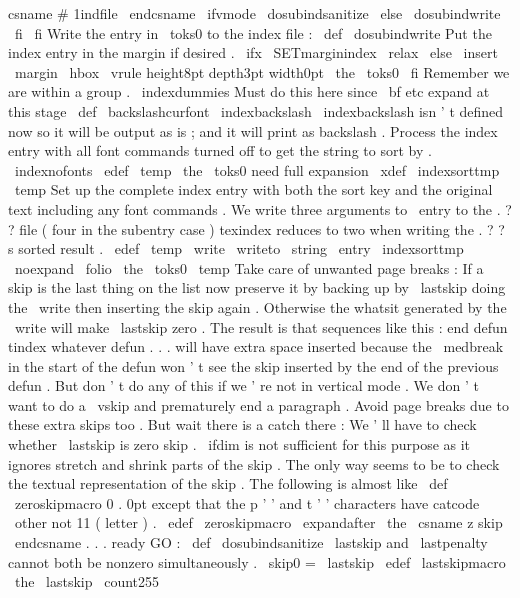 {{{{csname
#
1indfile
\
endcsname
}
%
%
\
ifvmode
\
dosubindsanitize
\
else
\
dosubindwrite
\
fi
}
%
\
fi
}
%
Write
the
entry
in
\
toks0
to
the
index
file
:
%
\
def
\
dosubindwrite
{
%
%
Put
the
index
entry
in
the
margin
if
desired
.
\
ifx
\
SETmarginindex
\
relax
\
else
\
insert
\
margin
{
\
hbox
{
\
vrule
height8pt
depth3pt
width0pt
\
the
\
toks0
}
}
%
\
fi
%
%
Remember
we
are
within
a
group
.
\
indexdummies
%
Must
do
this
here
since
\
bf
etc
expand
at
this
stage
\
def
\
backslashcurfont
{
\
indexbackslash
}
%
\
indexbackslash
isn
'
t
defined
now
%
so
it
will
be
output
as
is
;
and
it
will
print
as
backslash
.
%
%
Process
the
index
entry
with
all
font
commands
turned
off
to
%
get
the
string
to
sort
by
.
{
\
indexnofonts
\
edef
\
temp
{
\
the
\
toks0
}
%
need
full
expansion
\
xdef
\
indexsorttmp
{
\
temp
}
%
}
%
%
%
Set
up
the
complete
index
entry
with
both
the
sort
key
and
%
the
original
text
including
any
font
commands
.
We
write
%
three
arguments
to
\
entry
to
the
.
?
?
file
(
four
in
the
%
subentry
case
)
texindex
reduces
to
two
when
writing
the
.
?
?
s
%
sorted
result
.
\
edef
\
temp
{
%
\
write
\
writeto
{
%
\
string
\
entry
{
\
indexsorttmp
}
{
\
noexpand
\
folio
}
{
\
the
\
toks0
}
}
%
}
%
\
temp
}
%
Take
care
of
unwanted
page
breaks
:
%
%
If
a
skip
is
the
last
thing
on
the
list
now
preserve
it
%
by
backing
up
by
\
lastskip
doing
the
\
write
then
inserting
%
the
skip
again
.
Otherwise
the
whatsit
generated
by
the
%
\
write
will
make
\
lastskip
zero
.
The
result
is
that
sequences
%
like
this
:
%
end
defun
%
tindex
whatever
%
defun
.
.
.
%
will
have
extra
space
inserted
because
the
\
medbreak
in
the
%
start
of
the
defun
won
'
t
see
the
skip
inserted
by
the
end
of
%
the
previous
defun
.
%
%
But
don
'
t
do
any
of
this
if
we
'
re
not
in
vertical
mode
.
We
%
don
'
t
want
to
do
a
\
vskip
and
prematurely
end
a
paragraph
.
%
%
Avoid
page
breaks
due
to
these
extra
skips
too
.
%
%
But
wait
there
is
a
catch
there
:
%
We
'
ll
have
to
check
whether
\
lastskip
is
zero
skip
.
\
ifdim
is
not
%
sufficient
for
this
purpose
as
it
ignores
stretch
and
shrink
parts
%
of
the
skip
.
The
only
way
seems
to
be
to
check
the
textual
%
representation
of
the
skip
.
%
%
The
following
is
almost
like
\
def
\
zeroskipmacro
{
0
.
0pt
}
except
that
%
the
p
'
'
and
t
'
'
characters
have
catcode
\
other
not
11
(
letter
)
.
%
\
edef
\
zeroskipmacro
{
\
expandafter
\
the
\
csname
z
skip
\
endcsname
}
%
%
.
.
.
ready
GO
:
%
\
def
\
dosubindsanitize
{
%
%
\
lastskip
and
\
lastpenalty
cannot
both
be
nonzero
simultaneously
.
\
skip0
=
\
lastskip
\
edef
\
lastskipmacro
{
\
the
\
lastskip
}
%
\
count255
}}
